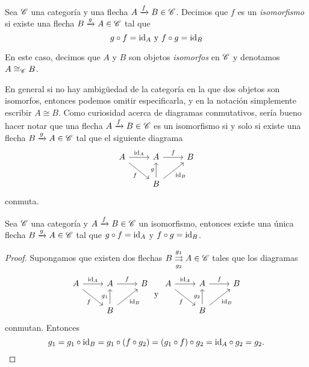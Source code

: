 \documentclass{comunicaciones}
\begin{document}
\begin{dfn}[Isomorfismo]
    Sea $\mathscr C$ una categoría y una flecha $A\xrightarrow{f}B\in\mathscr C$. Decimos que $f$ es un \emph{isomorfismo} si existe una flecha 
    $B\xrightarrow{g}A\in\mathscr C$ tal que $$g\circ f=\mathrm{id}_A \text{  y  } f\circ g=\mathrm{id}_B$$
    
    En este caso, decimos que $A$ y $B$ son objetos \emph{isomorfos} en $\mathscr C$ y denotamos $A\cong_\mathscr C B$.
\end{dfn}

En general si no hay ambigüedad de la categoría en la que dos objetos son isomorfos, entonces podemos omitir especificarla, y en la notación
simplemente escribir $A\cong B$.
Como curiosidad acerca de diagramas conmutativos, sería bueno hacer notar que una flecha $A\xrightarrow{f}B\in\mathscr C$ es un isomorfismo si y solo si
existe una flecha $B\xrightarrow{g}A\in\mathscr C$ tal que el siguiente diagrama
\[\begin{tikzcd}
    A \arrow[rd, "f"'] \arrow[r, "\id_A"] & A \arrow[r, "f"]                      & B \\
                                          & B \arrow[u, "g"] \arrow[ru, "\id_B"'] &  
\end{tikzcd}\]
conmuta.

\begin{prop}
    Sea $\mathscr C$ una categoría y $A\xrightarrow{f}B\in\mathscr C$ un isomorfismo, entonces existe una única flecha $B\xrightarrow{g}A\in\mathscr C$ tal que
    $g\circ f=\mathrm{id}_A$ y $f\circ g=\mathrm{id}_B$.
\end{prop}
\begin{proof}
    Supongamos que existen dos flechas $B \overset{g_1}{\underset{g_2}{\rightrightarrows}}A\in\mathscr C$ tales que los diagramas
    $$\begin{tikzcd}
        A \arrow[rd, "f"'] \arrow[r, "\id_A"] & A \arrow[r, "f"]                      & B \\
                                              & B \arrow[u, "g_1"] \arrow[ru, "\id_B"'] &  
    \end{tikzcd} \text{ y } \begin{tikzcd}
        A \arrow[rd, "f"'] \arrow[r, "\id_A"] & A \arrow[r, "f"]                      & B \\
                                              & B \arrow[u, "g_2"] \arrow[ru, "\id_B"'] &  
    \end{tikzcd} $$
    conmutan. Entonces
    $$g_1=g_1\circ\mathrm{id}_B=g_1\circ(f\circ g_2)=(g_1\circ f)\circ g_2=\mathrm{id}_A\circ g_2=g_2.$$
\end{proof}
\end{document}
